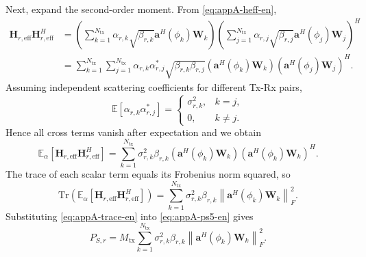 \documentclass[conference,twocolumn,a4paper]{IEEEtran}
\begin{document}
Next, expand the second-order moment. From \eqref{eq:appA-heff-en},
\begin{align}
\mathbf{H}_{r,\mathrm{eff}}\mathbf{H}_{r,\mathrm{eff}}^H
&=\left(\sum_{k=1}^{N_{\mathrm{tx}}}\alpha_{r,k}\sqrt{\beta_{r,k}}\mathbf{a}^H(\phi_k)\mathbf{W}_k\right)
\left(\sum_{j=1}^{N_{\mathrm{tx}}}\alpha_{r,j}\sqrt{\beta_{r,j}}\mathbf{a}^H(\phi_j)\mathbf{W}_j\right)^H \nonumber\\
&=\sum_{k=1}^{N_{\mathrm{tx}}}\sum_{j=1}^{N_{\mathrm{tx}}}\alpha_{r,k}\alpha_{r,j}^*\sqrt{\beta_{r,k}\beta_{r,j}}\left(\mathbf{a}^H(\phi_k)\mathbf{W}_k\right)\left(\mathbf{a}^H(\phi_j)\mathbf{W}_j\right)^H.
\label{eq:appA-expand-en}
\end{align}
Assuming independent scattering coefficients for different Tx-Rx pairs,
\begin{equation}
\mathbb{E}\!\left[\alpha_{r,k}\alpha_{r,j}^*\right]=
\begin{cases}
\sigma_{r,k}^2, & k=j,\\
0, & k\neq j.
\end{cases}
\label{eq:appA-rcs-en}
\end{equation}
Hence all cross terms vanish after expectation and we obtain
\begin{equation}
\mathbb{E}_{\alpha}\!\left[\mathbf{H}_{r,\mathrm{eff}}\mathbf{H}_{r,\mathrm{eff}}^H\right]
=\sum_{k=1}^{N_{\mathrm{tx}}}\sigma_{r,k}^2\beta_{r,k}\left(\mathbf{a}^H(\phi_k)\mathbf{W}_k\right)\left(\mathbf{a}^H(\phi_k)\mathbf{W}_k\right)^H.
\label{eq:appA-expheff-en}
\end{equation}
The trace of each scalar term equals its Frobenius norm squared, so
\begin{equation}
\mathrm{Tr}\!\left(\mathbb{E}_{\alpha}\!\left[\mathbf{H}_{r,\mathrm{eff}}\mathbf{H}_{r,\mathrm{eff}}^H\right]\right)
=\sum_{k=1}^{N_{\mathrm{tx}}}\sigma_{r,k}^2\beta_{r,k}\left\|\mathbf{a}^H(\phi_k)\mathbf{W}_k\right\|_F^2.
\label{eq:appA-trace-en}
\end{equation}
Substituting \eqref{eq:appA-trace-en} into \eqref{eq:appA-ps5-en} gives
\begin{equation}
P_{S,r}=M_{\mathrm{tx}}\sum_{k=1}^{N_{\mathrm{tx}}}\sigma_{r,k}^2\beta_{r,k}\left\|\mathbf{a}^H(\phi_k)\mathbf{W}_k\right\|_F^2.
\label{eq:appA-ps-final-en}
\end{equation}
\end{document}
